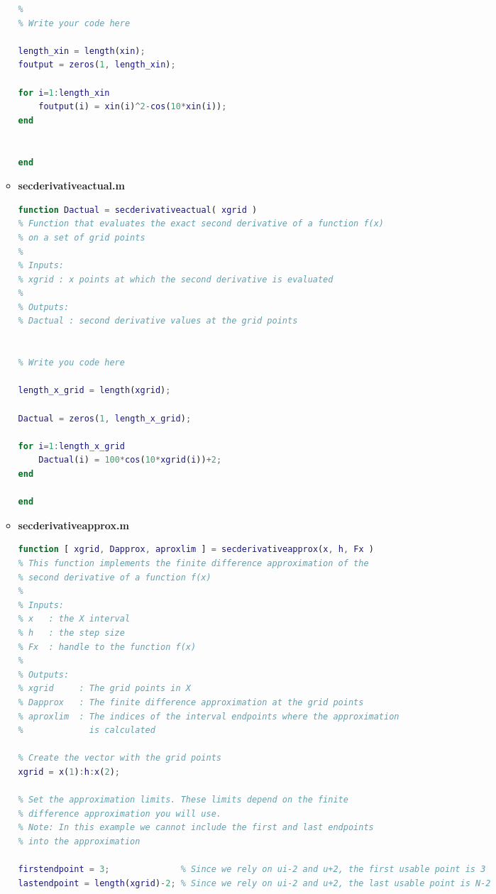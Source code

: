 \documentclass[12pt,letterpaper]{article}
\begin{document}
\begin{enumerate}
\begin{itemize}
\begin{lstlisting}[language = Matlab]
% Evaluate the function at xin, assign the result to foutput
%
% Write your code here

length_xin = length(xin);
foutput = zeros(1, length_xin);

for i=1:length_xin
    foutput(i) = xin(i)^2-cos(10*xin(i));
end


end\end{lstlisting}
\pagebreak
		\item \textbf{secderivativeactual.m}
        \begin{lstlisting}[language = Matlab]
function Dactual = secderivativeactual( xgrid )
% Function that evaluates the exact second derivative of a function f(x)
% on a set of grid points
%
% Inputs:
% xgrid : x points at which the second derivative is evaluated
%
% Outputs:
% Dactual : second derivative values at the grid points


% Write you code here

length_x_grid = length(xgrid);

Dactual = zeros(1, length_x_grid);

for i=1:length_x_grid
    Dactual(i) = 100*cos(10*xgrid(i))+2;
end

end\end{lstlisting}
\pagebreak
		\item \textbf{secderivativeapprox.m}
        \begin{lstlisting}[language = Matlab]
function [ xgrid, Dapprox, aproxlim ] = secderivativeapprox(x, h, Fx )
% This function implements the finite difference approximation of the
% second derivative of a function f(x)
%
% Inputs:
% x   : the X interval
% h   : the step size
% Fx  : handle to the function f(x)
%
% Outputs:
% xgrid     : The grid points in X
% Dapprox   : The finite difference approximation at the grid points
% aproxlim  : The indices of the interval endpoints where the approximation
%             is calculated

% Create the vector with the grid points
xgrid = x(1):h:x(2);

% Set the approximation limits. These limits depend on the finite
% difference approximation you will use.
% Note: In this example we cannot include the first and last endpoints
% into the approximation

firstendpoint = 3;              % Since we rely on ui-2 and u+2, the first usable point is 3
lastendpoint = length(xgrid)-2; % Since we rely on ui-2 and u+2, the last usable point is N-2



\end{lstlisting}
\end{itemize}
\end{enumerate}
\end{document}
